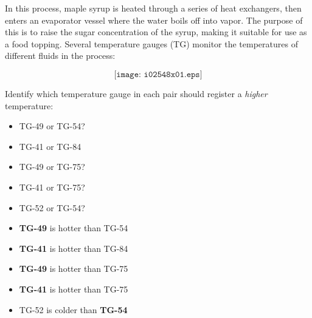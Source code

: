 

In this process, maple syrup is heated through a series of heat exchangers, then enters an evaporator vessel where the water boils off into vapor.  The purpose of this is to raise the sugar concentration of the syrup, making it suitable for use as a food topping.  Several temperature gauges (TG) monitor the temperatures of different fluids in the process:

$$\texttt{[image: i02548x01.eps]}$$

Identify which temperature gauge in each pair should register a {\it higher} temperature:

\begin{itemize}
\item{} TG-49 or TG-54?
\vskip 5pt
\item{} TG-41 or TG-84
\vskip 5pt
\item{} TG-49 or TG-75?
\vskip 5pt
\item{} TG-41 or TG-75?
\vskip 5pt
\item{} TG-52 or TG-54?
\end{itemize}







\begin{itemize}
\item{} {\bf TG-49} is hotter than TG-54
\item{} {\bf TG-41} is hotter than TG-84
\item{} {\bf TG-49} is hotter than TG-75
\item{} {\bf TG-41} is hotter than TG-75
\item{} TG-52 is colder than {\bf TG-54}
\end{itemize}












